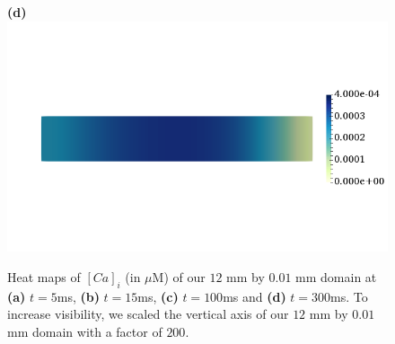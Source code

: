 \documentclass[12pt,a4paper]{article}
\begin{document}
\begin{figure}
\begin{minipage}{0.47\textwidth}
  \textbf{(d)} \includegraphics[trim=0cm 4cm 0cm 4cm, clip=true, width=0.9\linewidth]{c300}
    \end{minipage}
    \caption{Heat maps of $[Ca]_i$ (in $\mu$M) of our $12$ mm by $0.01$ mm domain at \textbf{(a)} $t=5$ms, \textbf{(b)} $t=15$ms, \textbf{(c)} $t=100$ms and \textbf{(d)} $t=300$ms. To increase visibility, we scaled the vertical axis of our $12$ mm by $0.01$ mm domain with a factor of $200$.}
    \label{fig:2}
\end{figure}
%
\end{document}
